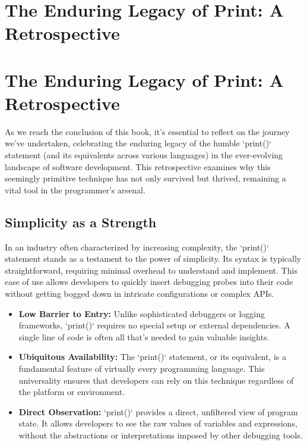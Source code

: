 \documentclass{article}
\begin{document}
{{{{%

\section*{The Enduring Legacy of Print: A Retrospective} %
\label{chapter-10-1-The_Enduring_Legacy_of_Print__A_Retrospe}

\section*{The Enduring Legacy of Print: A Retrospective}

As we reach the conclusion of this book, it's essential to reflect on the journey we've undertaken, celebrating the enduring legacy of the humble `print()` statement (and its equivalents across various languages) in the ever-evolving landscape of software development. This retrospective examines why this seemingly primitive technique has not only survived but thrived, remaining a vital tool in the programmer's arsenal.

\subsection*{Simplicity as a Strength}

In an industry often characterized by increasing complexity, the `print()` statement stands as a testament to the power of simplicity. Its syntax is typically straightforward, requiring minimal overhead to understand and implement. This ease of use allows developers to quickly insert debugging probes into their code without getting bogged down in intricate configurations or complex APIs.

\begin{itemize}
    \item \textbf{Low Barrier to Entry:} Unlike sophisticated debuggers or logging frameworks, `print()` requires no special setup or external dependencies. A single line of code is often all that's needed to gain valuable insights.
    \item \textbf{Ubiquitous Availability:} The `print()` statement, or its equivalent, is a fundamental feature of virtually every programming language. This universality ensures that developers can rely on this technique regardless of the platform or environment.
    \item \textbf{Direct Observation:} `print()` provides a direct, unfiltered view of program state. It allows developers to see the raw values of variables and expressions, without the abstractions or interpretations imposed by other debugging tools.
\end{itemize}

}}}}
\end{document}
